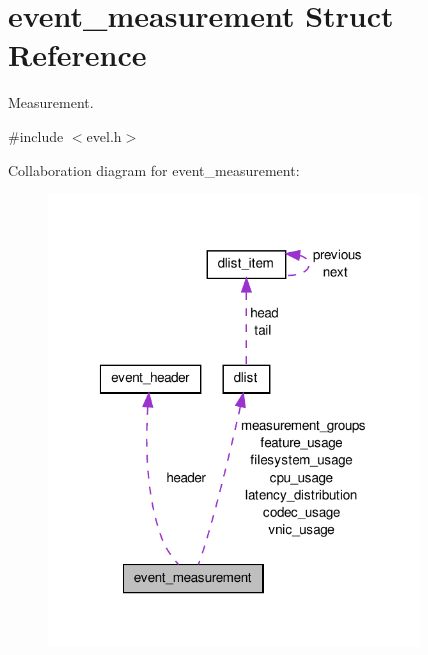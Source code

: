 \hypertarget{structevent__measurement}{}\section{event\+\_\+measurement Struct Reference}
\label{structevent__measurement}


Measurement.  




{\ttfamily \#include $<$evel.\+h$>$}



Collaboration diagram for event\+\_\+measurement\+:
\nopagebreak
\begin{figure}[H]
\begin{center}
\leavevmode
\includegraphics[width=279pt]{structevent__measurement__coll__graph}
\end{center}
\end{figure}
